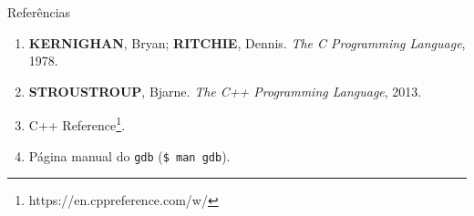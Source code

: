 \begin{frame}[fragile]{Referências}

    \begin{enumerate}
        \item \textbf{KERNIGHAN}, Bryan; \textbf{RITCHIE}, Dennis. \textit{The C Programming Language}, 1978.

        \item \textbf{STROUSTROUP}, Bjarne. \textit{The C++ Programming Language}, 2013.

		\item C++ Reference\footnote{https://en.cppreference.com/w/}.

        \item Página manual do \texttt{gdb} (\texttt{\$ man gdb}).

    \end{enumerate}

\end{frame}
